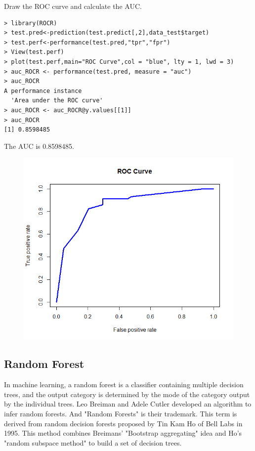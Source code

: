 \documentclass{article}
\begin{document}
Draw the ROC curve and calculate the AUC.
\begin{lstlisting}
> library(ROCR)
> test.pred<-prediction(test.predict[,2],data_test$target)
> test.perf<-performance(test.pred,"tpr","fpr")  
> View(test.perf) 
> plot(test.perf,main="ROC Curve",col = "blue", lty = 1, lwd = 3)
> auc_ROCR <- performance(test.pred, measure = "auc")
> auc_ROCR
A performance instance
  'Area under the ROC curve'
> auc_ROCR <- auc_ROCR@y.values[[1]]
> auc_ROCR
[1] 0.8598485
\end{lstlisting}
The AUC is 0.8598485.
 \begin{figure}[H]
\centering
  \includegraphics[width=.7\textwidth]{1-2-2.png} %

\end{figure}


\subsection{Random Forest}
In machine learning, a random forest is a classifier containing multiple decision trees, and the output category is determined by the mode of the category output by the individual trees. Leo Breiman and Adele Cutler developed an algorithm to infer random forests. And "Random Forests" is their trademark. This term is derived from random decision forests proposed by Tin Kam Ho of Bell Labs in 1995. This method combines Breimans' "Bootstrap aggregating" idea and Ho's "random subspace method" to build a set of decision trees.
\end{document}
